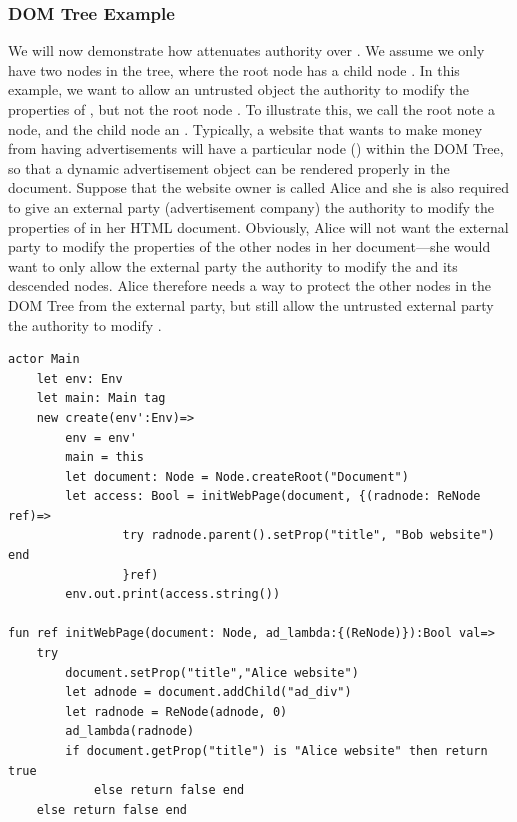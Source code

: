 \documentclass[a4paper,11pt,twoside]{article}
\begin{document}
\subsubsection{DOM Tree Example}\label{domexample}
We will now demonstrate how  attenuates authority over . We assume we only have two nodes in the tree, where the root node  has a child node . In this example, we want to allow an untrusted object  the authority to modify the properties of , but not the root node . To illustrate this, we call the root note  a  node, and the child node  an .  Typically, a website that wants to make money from having advertisements will have a particular node () within the DOM Tree, so that a dynamic advertisement object can be rendered properly in the document. Suppose that the website owner is called Alice and she is also required to give an external party (advertisement company) the authority to modify the properties of  in her HTML document. Obviously, Alice will not want the external party to modify the properties of the other nodes in her document---she would want to only allow the external party the authority to modify the  and its descended nodes. Alice therefore needs a way to protect the other nodes in the DOM Tree from the external party, but still allow the untrusted external party the authority to modify .\\
\begin{lstlisting}
actor Main
    let env: Env
    let main: Main tag
    new create(env':Env)=>
        env = env'
        main = this
        let document: Node = Node.createRoot("Document")
        let access: Bool = initWebPage(document, {(radnode: ReNode ref)=>
                try radnode.parent().setProp("title", "Bob website") end 
                }ref)
        env.out.print(access.string())
         
fun ref initWebPage(document: Node, ad_lambda:{(ReNode)}):Bool val=>
    try
        document.setProp("title","Alice website")
        let adnode = document.addChild("ad_div")
        let radnode = ReNode(adnode, 0)
        ad_lambda(radnode)
        if document.getProp("title") is "Alice website" then return true
            else return false end
    else return false end
\end{lstlisting}
\end{document}
